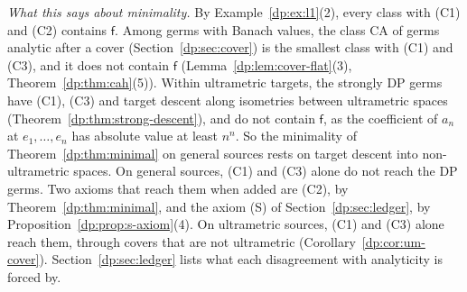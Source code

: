 \emph{What this says about minimality.} By Example~\ref{dp:ex:l1}(2), every class with (C1) and (C2) contains $\mathsf f$. Among germs with Banach values, the class CA of germs analytic after a cover (Section~\ref{dp:sec:cover}) is the smallest class with (C1) and (C3), and it does not contain $\mathsf f$ (Lemma~\ref{dp:lem:cover-flat}(3), Theorem~\ref{dp:thm:cah}(5)). Within ultrametric targets, the strongly DP germs have (C1), (C3) and target descent along isometries between ultrametric spaces (Theorem~\ref{dp:thm:strong-descent}), and do not contain $\mathsf f$, as the coefficient of $a_n$ at $e_1,\dots,e_n$ has absolute value at least $n^n$. So the minimality of Theorem~\ref{dp:thm:minimal} on general sources rests on target descent into non-ultrametric spaces. On general sources, (C1) and (C3) alone do not reach the DP germs. Two axioms that reach them when added are (C2), by Theorem~\ref{dp:thm:minimal}, and the axiom (S) of Section~\ref{dp:sec:ledger}, by Proposition~\ref{dp:prop:s-axiom}(4). On ultrametric sources, (C1) and (C3) alone reach them, through covers that are not ultrametric (Corollary~\ref{dp:cor:um-cover}). Section~\ref{dp:sec:ledger} lists what each disagreement with analyticity is forced by.
